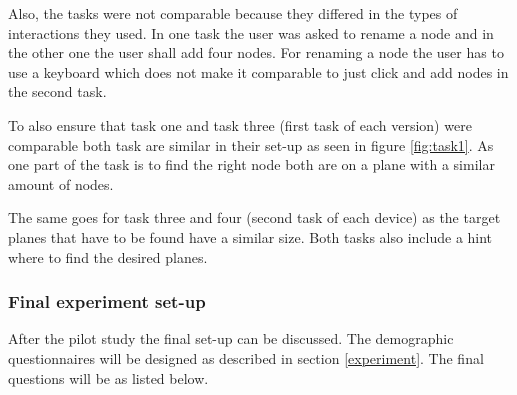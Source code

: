 Also, the tasks were not comparable because they differed in the types of interactions they used.
In one task the user was asked to rename a node and in the other one the user shall add four nodes.
For renaming a node the user has to use a keyboard which does not make it comparable to just click and add nodes in the second task.

To also ensure that task one and task three (first task of each version) were comparable both task are similar in their set-up as seen in figure \ref{fig:task1}.
As one part of the task is to find the right node both are on a plane with a similar amount of nodes.

The same goes for task three and four (second task of each device) as the target planes that have to be found have a similar size. 
Both tasks also include a hint where to find the desired planes.

\subsubsection{Final experiment set-up}
\label{final}
After the pilot study the final set-up can be discussed.
The demographic questionnaires will be designed as described in section \ref{experiment}.
The final questions will be as listed below.
